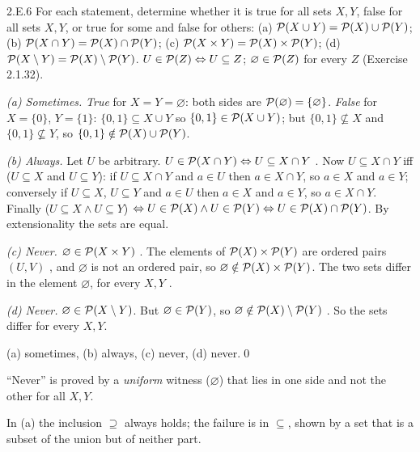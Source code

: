 \begin{bookex}[essential]{2.E.6}
For each statement, determine whether it is true for all sets $X,Y$, false for all sets $X,Y$, or true for some and false for others: (a) $\mathcal{P}(X\cup Y)=\mathcal{P}(X)\cup\mathcal{P}(Y)$; (b) $\mathcal{P}(X\cap Y)=\mathcal{P}(X)\cap\mathcal{P}(Y)$; (c) $\mathcal{P}(X\times Y)=\mathcal{P}(X)\times\mathcal{P}(Y)$; (d) $\mathcal{P}(X\setminus Y)=\mathcal{P}(X)\setminus\mathcal{P}(Y)$.
\solution
\given $U\in\mathcal{P}(Z)\Leftrightarrow U\subseteq Z$; $\varnothing\in\mathcal{P}(Z)$ for every $Z$ (Exercise 2.1.32).
\begin{steps}
\item \emph{(a) Sometimes.} \emph{True} for $X=Y=\varnothing$: both sides are $\mathcal{P}(\varnothing)=\{\varnothing\}$. \emph{False} for $X=\{0\}$, $Y=\{1\}$: $\{0,1\}\subseteq X\cup Y$ so $\{0,1\}\in\mathcal{P}(X\cup Y)$; but $\{0,1\}\nsubseteq X$ and $\{0,1\}\nsubseteq Y$, so $\{0,1\}\notin\mathcal{P}(X)\cup\mathcal{P}(Y)$.
\item \emph{(b) Always.} Let $U$ be arbitrary. $U\in\mathcal{P}(X\cap Y)\Leftrightarrow U\subseteq X\cap Y$ . Now $U\subseteq X\cap Y$ iff ($U\subseteq X$ and $U\subseteq Y$): if $U\subseteq X\cap Y$ and $a\in U$ then $a\in X\cap Y$, so $a\in X$ and $a\in Y$; conversely if $U\subseteq X$, $U\subseteq Y$ and $a\in U$ then $a\in X$ and $a\in Y$, so $a\in X\cap Y$. Finally ($U\subseteq X\wedge U\subseteq Y$) $\Leftrightarrow U\in\mathcal{P}(X)\wedge U\in\mathcal{P}(Y)\Leftrightarrow U\in\mathcal{P}(X)\cap\mathcal{P}(Y)$. By extensionality the sets are equal.
\item \emph{(c) Never.} $\varnothing\in\mathcal{P}(X\times Y)$ . The elements of $\mathcal{P}(X)\times\mathcal{P}(Y)$ are ordered pairs $(U,V)$ , and $\varnothing$ is not an ordered pair, so $\varnothing\notin\mathcal{P}(X)\times\mathcal{P}(Y)$. The two sets differ in the element $\varnothing$, for every $X,Y$ .
\item \emph{(d) Never.} $\varnothing\in\mathcal{P}(X\setminus Y)$. But $\varnothing\in\mathcal{P}(Y)$, so $\varnothing\notin\mathcal{P}(X)\setminus\mathcal{P}(Y)$ . So the sets differ for every $X,Y$.
\end{steps}
\conclusion (a) sometimes, (b) always, (c) never, (d) never.\qed
\begin{compare}
\item ``Never'' is proved by a \emph{uniform} witness ($\varnothing$) that lies in one side and not the other for all $X,Y$.
\item In (a) the inclusion $\supseteq$ always holds; the failure is in $\subseteq$, shown by a set that is a subset of the union but of neither part.
\end{compare}
\end{bookex}

